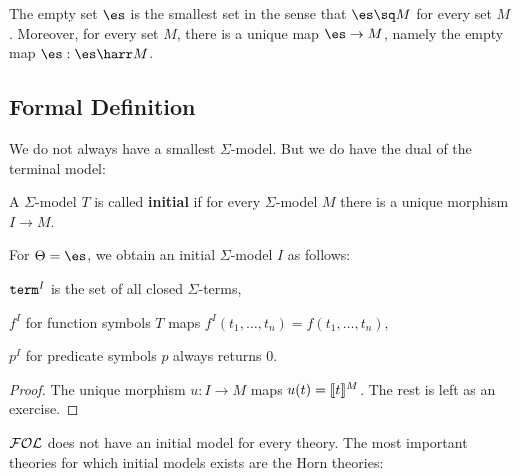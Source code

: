 The empty set $\es$ is the smallest set in the sense that $\es\sq M$ for every set $M$.
Moreover, for every set $M$, there is a unique map $\es\to M$, namely the empty map $\es:\es\harr M$.

\subsection{Formal Definition}

We do not always have a smallest $\Sigma$-model.
But we do have the dual of the terminal model:

\begin{definition}
A $\Sigma$-model $T$ is called \textbf{initial} if for every $\Sigma$-model $M$ there is a unique morphism $I\to M$.
\end{definition}

\begin{theorem}\label{thm:univ:termmodel}
For $\Theta=\es$, we obtain an initial $\Sigma$-model $I$ as follows:
\begin{compactitem}
 \item $\mathtt{term}^I$ is the set of all closed $\Sigma$-terms,
 \item $f^I$ for function symbols $T$ maps $f^I(t_1,\ldots,t_n)=f(t_1,\ldots,t_n)$,
 \item $p^I$ for predicate symbols $p$ always returns $0$.
\end{compactitem}
\end{theorem}
\begin{proof}
The unique morphism $u:I\to M$ maps $u(t)=\llbracket t\rrbracket^{M}$.
The rest is left as an exercise.
\end{proof}

${\mathcal{FOL}}$ does not have an initial model for every theory.
The most important theories for which initial models exists are the Horn theories:

